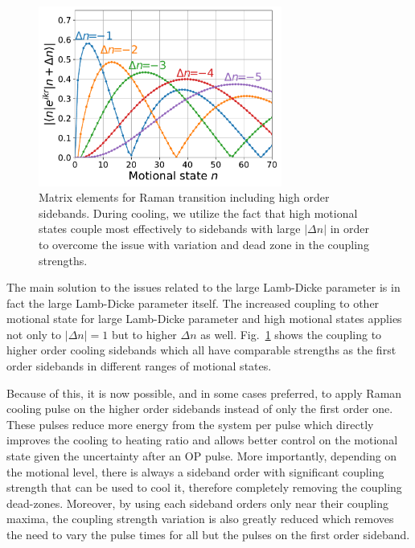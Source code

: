 \begin{figure}
  \centering
  \includegraphics[width=8cm]{figures/na_rsc_mele_raman.pdf}
  \caption[Raman coupling including high order sidebands]{
    Matrix elements for Raman transition including high order sidebands.
    During cooling, we utilize the fact that high motional states couple most effectively
    to sidebands with large $|\Delta n|$ in order to overcome the issue with
    variation and dead zone in the coupling strengths.
    \label{fig:na-rsc-mele-raman}}
\end{figure}

The main solution to the issues related to the large Lamb-Dicke parameter
is in fact the large Lamb-Dicke parameter itself.
The increased coupling to other motional state for large Lamb-Dicke parameter
and high motional states applies not only to $|\Delta n|=1$ but to higher $\Delta n$ as well.
Fig.~\ref{fig:na-rsc-mele-raman} shows the coupling to higher order cooling sidebands
which all have comparable strengths as the first order sidebands in different ranges
of motional states.

Because of this, it is now possible, and in some cases preferred, to apply Raman cooling pulse
on the higher order sidebands instead of only the first order one.
These pulses reduce more energy from the system per pulse which directly improves
the cooling to heating ratio and allows better control on the motional state
given the uncertainty after an OP pulse.
More importantly, depending on the motional level, there is always a sideband order
with significant coupling strength that can be used to cool it,
therefore completely removing the coupling dead-zones.
Moreover, by using each sideband orders only near their coupling maxima,
the coupling strength variation is also greatly reduced which removes
the need to vary the pulse times for all but the pulses on the first order sideband.

